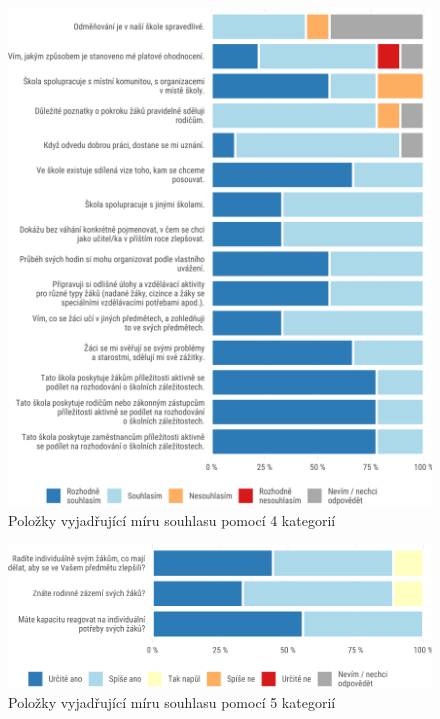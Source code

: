 \documentclass[12pt,a4paper,]{report}
\begin{document}
\begin{figure}

{\centering \includegraphics[width=\textwidth]{figs/likert-1}

}

\caption{Položky vyjadřující míru souhlasu pomocí 4 kategorií}\label{fig:likert}
\end{figure}

\begin{figure}

{\centering \includegraphics[width=\textwidth]{figs/midpoint-1}

}

\caption{Položky vyjadřující míru souhlasu pomocí 5 kategorií}\label{fig:midpoint}
\end{figure}
\end{document}
